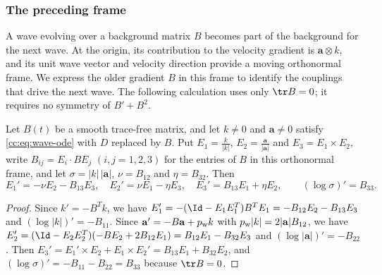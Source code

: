 \subsubsection{The preceding frame}\label{cc:sec:frame}
A wave evolving over a background matrix $B$ becomes part of the
background for the next wave. At the origin, its contribution to the
velocity gradient is $\mathbf a\otimes k$, and its unit wave vector and
velocity direction provide a moving orthonormal frame. We express the
older gradient $B$ in this frame to identify the couplings that drive the
next wave. The following calculation uses only $\tr B=0$; it requires no
symmetry of $B'+B^2$.

\begin{lemma}\label{cc:lem:frame}
Let $B(t)$ be a smooth trace-free matrix, and let $k\ne0$ and
$\mathbf a\ne0$ satisfy \eqref{cc:eq:wave-ode} with $D$ replaced by $B$.
Put $E_1=\frac{k}{|k|}$, $E_2=\frac{\mathbf a}{|\mathbf a|}$ and $E_3=E_1\times E_2$,
write $B_{ij}=E_i\cdot BE_j$ $(i,j=1,2,3)$ for the entries of $B$ in this
orthonormal frame, and let $\sigma=|k|\,|\mathbf a|$, $\nu=B_{12}$ and
$\eta=B_{32}$. Then
\begin{equation}\label{cc:eq:frame}
 E_1'=-\nu E_2-B_{13}E_3,\quad
 E_2'=\nu E_1-\eta E_3,\quad
 E_3'=B_{13}E_1+\eta E_2,
 \qquad(\log\sigma)'=B_{33}.
\end{equation}
\end{lemma}
\begin{proof}
Since $k'=-B^Tk$, we have $E_1'=-(\Id-E_1E_1^T)B^TE_1=-B_{12}E_2-B_{13}E_3$
and $(\log|k|)'=-B_{11}$. Since $\mathbf a'=-B\mathbf a+p_{\rm w} k$
with $p_{\rm w}|k|=2|\mathbf a|B_{12}$, we have
$E_2'=(\Id-E_2E_2^T)(-BE_2+2B_{12}E_1)=B_{12}E_1-B_{32}E_3$ and
$(\log|\mathbf a|)'=-B_{22}$. Then
$E_3'=E_1'\times E_2+E_1\times E_2'=B_{13}E_1+B_{32}E_2$, and
$(\log\sigma)'=-B_{11}-B_{22}=B_{33}$ because $\tr B=0$.
\end{proof}
